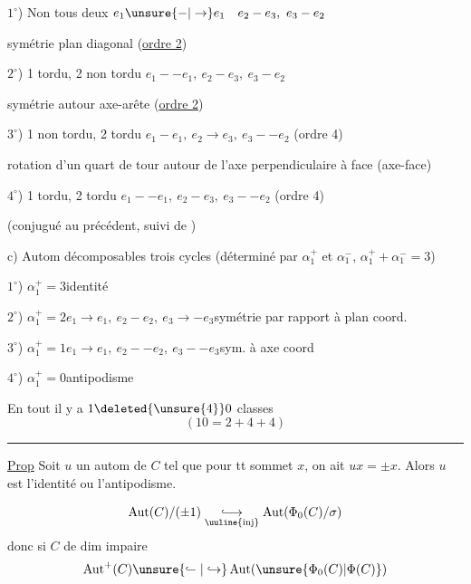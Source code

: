 $1^\circ$) Non  tous deux \quad $e_1\unsure{-|\to}e_1\quad e_2-e_3,\ e_3-e_2$

symétrie  plan diagonal (\uline{ordre 2})

$2^\circ$) 1 tordu, 2 non tordu \quad $e_1-{-e_1},\ e_2-e_3,\ e_3-e_2$

symétrie autour axe-arête  (\uline{ordre 2})

$3^\circ$) 1 non tordu, 2 tordu \quad $e_1-e_1,\ e_2\to e_3,\ e_3-{-e_2}$ (ordre 4)

rotation d'un quart de tour autour de l'axe perpendiculaire à  face (axe-face)

$4^\circ$) 1 tordu, 2 tordu \quad $e_1-{-e_1},\ e_2-e_3,\ e_3-{-e_2}$ (ordre 4)

(conjugué au précédent, suivi de  )

c) Autom décomposables  trois cycles (déterminé par $\alpha_1^+$ et $\alpha_1^-$, $\alpha_1^++\alpha_1^-=3$)

$1^\circ$) $\alpha_1^+=3$\qquad identité

$2^\circ$) $\alpha_1^+=2$\qquad $e_1\to e_1,\ e_2-e_2,\ e_3\to -e_3$\qquad symétrie par rapport à plan  coord.

$3^\circ$) $\alpha_1^+=1$\qquad $e_1\to e_1,\ e_2-{-e_2},\ e_3-{-e_3}$\qquad sym.  à axe coord

$4^\circ$) $\alpha_1^+=0$\qquad antipodisme

En tout il y a $1\deleted{\unsure{4}}0$ classes 
\[
(10=2+4+4)
\]
\noindent\rule{\linewidth}{0.4pt}

\uline{Prop} Soit $u$ un autom de $C$ tel que pour tt sommet $x$, on ait $ux=\pm x$. Alors  $u$ est l'identité ou l'antipodisme.

\[
\operatorname{Aut}(C)/(\pm1)\underset{\text{\uuline{inj}}}{\lhook\joinrel\longrightarrow}\operatorname{Aut}(\Phi_0(C)/\sigma)
\]
donc si $C$ de dim impaire
\[
\operatorname{Aut}^+(C)\unsure{\lhook\joinrel\relbar|\hookrightarrow}\operatorname{Aut}(\unsure{\Phi_0(C)|\Phi(C)})
\]
